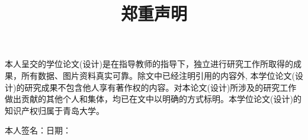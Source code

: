 \begin{center}

\title{郑重声明}
\date{}
\maketitle

\end{center}

\vspace{3em}
本人呈交的学位论文(设计)是在指导教师的指导下，独立进行研究工作所取得的成果，所有数据、图片资料真实可靠。除文中已经注明引用的内容外, 本学位论文(设计)的研究成果不包含他人享有著作权的内容。对本论文(设计)所涉及的研究工作做出贡献的其他个人和集体，均已在文中以明确的方式标明。本学位论文(设计)的知识产权归属于青岛大学。

\vspace{3em}
本人签名：\hspace{4cm}日期：